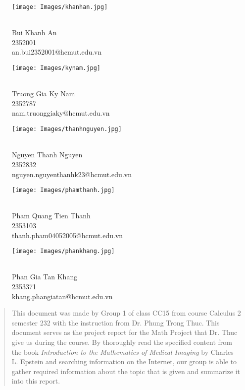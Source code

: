 \documentclass[a4paper]{article}
\begin{document}
\newpage
\thispagestyle{empty}
\setcounter{page}{-2}
\begin{figure}[!htb]
    \begin{minipage}{0.48\textwidth}
      \centering
      \texttt{[image: Images/khanhan.jpg]}
      \caption*{\\ Bui Khanh An \\ 2352001 \\ an.bui2352001@hcmut.edu.vn}
    \end{minipage}
    \begin{minipage}{0.48\textwidth}
      \centering
      \texttt{[image: Images/kynam.jpg]}
      \caption*{\\ \centering Truong Gia Ky Nam \\ 2352787 \\ nam.truonggiaky@hcmut.edu.vn}
    \end{minipage}
\end{figure}
\begin{figure}[!htb]
    \begin{minipage}{0.48\textwidth}
      \centering
      \texttt{[image: Images/thanhnguyen.jpg]}
      \caption*{\\ \centering Nguyen Thanh Nguyen \\ 2352832 \\ nguyen.nguyenthanhk23@hcmut.edu.vn}
    \end{minipage}
    \begin{minipage}{0.48\textwidth}
      \centering
      \texttt{[image: Images/phamthanh.jpg]}
      \caption*{\\ \centering Pham Quang Tien Thanh \\ 2353103 \\ thanh.pham04052005@hcmut.edu.vn}
    \end{minipage}
\end{figure}
\begin{figure}[!htb]
    \centering
    \texttt{[image: Images/phankhang.jpg]}
    \caption*{\\ Phan Gia Tan Khang \\ 2353371 \\ khang.phangiatan@hcmut.edu.vn}
\end{figure}
\newpage

\newpage
\thispagestyle{empty}
\tableofcontents
\newpage

\newpage
\thispagestyle{empty}
\begin{abstract}
    \noindent This document was made by Group 1 of class CC15 from course Calculus 2 semester 232 with the instruction from Dr. Phung Trong Thuc. This document serves as the project report for the Math Project that Dr. Thuc give us during the course. By thoroughly read the specified content from the book \textit{Introduction to the Mathematics of Medical Imaging} by Charles L. Epstein and searching information on the Internet, our group is able to gather required information about the topic that is given and summarize it into this report.  
\end{abstract}
\newpage
\end{document}
